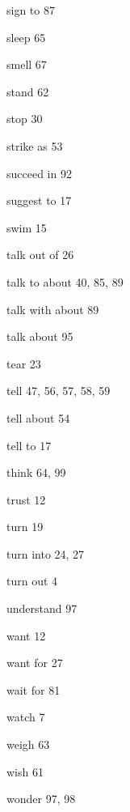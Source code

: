 \begin{theindex}
\item sign to  87
\item sleep  65
\item smell  67
\item stand  62 
\item stop  30 
\item strike as  53 
\item succeed in  92
\item suggest to 17 
\item swim  15 
\item talk out of  26
\item talk to about  40, 85, 89
\item talk with about  89
\item talk about 95
\item tear  23 
\item tell  47, 56, 57, 58, 59
\item tell about 54
\item tell to 17
\item think 64, 99
\item trust  12 
\item turn  19 
\item turn into  24, 27 
\item turn out  4 
\item understand  97
\item want  12 
\item want for  27 
\item wait for  81
\item watch 7
\item weigh  63 
\item wish  61 
\item wonder  97, 98

\end{theindex}




